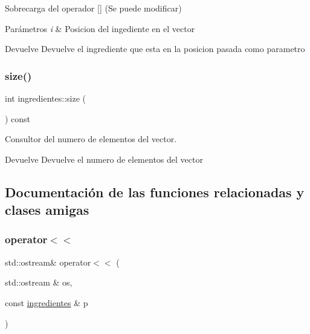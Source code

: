 Sobrecarga del operador \mbox{[}\mbox{]} (Se puede modificar) 


\begin{DoxyParams}{Parámetros}
{\em i} & Posicion del ingediente en el vector \\
\hline
\end{DoxyParams}
\begin{DoxyReturn}{Devuelve}
Devuelve el ingrediente que esta en la posicion pasada como parametro 
\end{DoxyReturn}
\mbox{\label{classingredientes_aaf628d0360800484ae277fbb7aa2f81d}} 
\subsubsection{\texorpdfstring{size()}{size()}}
{\footnotesize\ttfamily int ingredientes\+::size (\begin{DoxyParamCaption}{ }\end{DoxyParamCaption}) const}



Consultor del numero de elementos del vector. 

\begin{DoxyReturn}{Devuelve}
Devuelve el numero de elementos del vector 
\end{DoxyReturn}


\subsection{Documentación de las funciones relacionadas y clases amigas}
\mbox{\label{classingredientes_a47b68f377e21ce26320b8adb9c72f347}} 
\subsubsection{\texorpdfstring{operator$<$$<$}{operator<<}}
{\footnotesize\ttfamily std\+::ostream\& operator$<$$<$ (\begin{DoxyParamCaption}\item[{std\+::ostream \&}]{os,  }\item[{const \hyperlink{classingredientes}{ingredientes} \&}]{p }\end{DoxyParamCaption})\hspace{0.3cm}{\ttfamily [friend]}}



